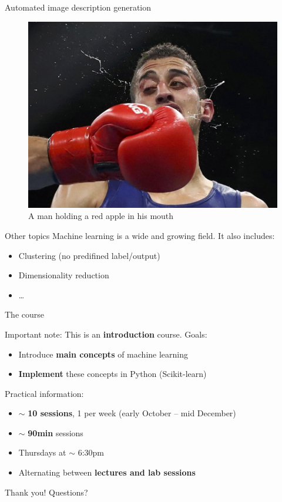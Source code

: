 \documentclass{beamer}
\begin{document}
\begin{frame}{Automated image description generation}

\begin{figure}
\vspace*{-0.15cm}
\centering
\includegraphics[width=\textwidth]{images/boxing.png}\\
\pause
A man holding a red apple in his mouth
\end{figure}

\end{frame}

\begin{frame}{Other topics}
\vfill
Machine learning is a wide and growing field. It also includes:	
\pause 
\vfill
\begin{itemize}
	\item Clustering (no predifined label/output)
\pause 
\vfill
	\item Dimensionality reduction
\pause 
\vfill
	\item \ldots
\end{itemize}
\vfill
\end{frame}

\begin{frame}{The course}

Important note: This is an \textbf{introduction} course. 
\vfill
\pause 
Goals:
\begin{itemize}
	\item Introduce \textbf{main concepts} of machine learning
	\item \textbf{Implement} these concepts in Python (Scikit-learn)
\end{itemize}
\vfill
\pause 
Practical information:
\begin{itemize}
	\item $\sim$ \textbf{10 sessions}, 1 per week (early October -- mid December)
	\item $\sim$ \textbf{90min} sessions
	\item Thursdays at $\sim$ 6:30pm
	\item Alternating between \textbf{lectures and lab sessions}
\end{itemize}
\end{frame}

\begin{frame}
\vfill
\centering
\huge{Thank you! Questions?}
\vfill
\end{frame}
\end{document}
